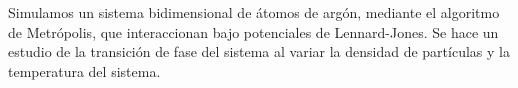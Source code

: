 Simulamos un sistema bidimensional de átomos de argón, mediante el algoritmo de Metrópolis, que interaccionan bajo potenciales de Lennard-Jones. Se hace un estudio de la transición de fase del sistema al variar la densidad de partículas y la temperatura del sistema.